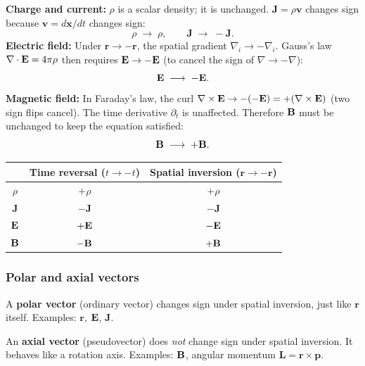\textbf{Charge and current:} $\rho$ is a scalar density; it is unchanged.  $\mathbf{J}=\rho\mathbf{v}$
changes sign because $\mathbf{v}=d\mathbf{x}/dt$ changes sign:
\begin{equation}\label{eq:lec10:P-rho-J}
  \rho \;\longrightarrow\; \rho, \qquad \mathbf{J} \;\longrightarrow\; -\mathbf{J} .
\end{equation}
\textbf{Electric field:} Under $\mathbf{r}\to-\mathbf{r}$, the spatial gradient $\nabla_i\to-\nabla_i$.
Gauss's law $\nabla\cdot\mathbf{E}=4\pi\rho$ then requires $\mathbf{E}\to-\mathbf{E}$ (to cancel the sign of
$\nabla\to-\nabla$):
\begin{equation}\label{eq:lec10:P-E}
  \mathbf{E} \;\longrightarrow\; -\mathbf{E} .
\end{equation}
\textbf{Magnetic field:} In Faraday's law, the curl $\nabla\times\mathbf{E}\to-(-\mathbf{E})=+(\nabla\times\mathbf{E})$
(two sign flips cancel).  The time derivative $\partial_t$ is unaffected.  Therefore $\mathbf{B}$ must be
unchanged to keep the equation satisfied:
\begin{equation}\label{eq:lec10:P-B}
  \mathbf{B} \;\longrightarrow\; +\mathbf{B} .
\end{equation}

\begin{center}
\renewcommand{\arraystretch}{1.3}
\begin{tabular}{ccc}
  \toprule
  & Time reversal ($t\to-t$) & Spatial inversion ($\mathbf{r}\to-\mathbf{r}$) \\
  \midrule
  $\rho$ & $+\rho$ & $+\rho$ \\
  $\mathbf{J}$ & $-\mathbf{J}$ & $-\mathbf{J}$ \\
  $\mathbf{E}$ & $+\mathbf{E}$ & $-\mathbf{E}$ \\
  $\mathbf{B}$ & $-\mathbf{B}$ & $+\mathbf{B}$ \\
  \bottomrule
\end{tabular}
\end{center}

\subsubsection*{Polar and axial vectors}

A \textbf{polar vector} (ordinary vector) changes sign under spatial inversion, just like $\mathbf{r}$
itself.  Examples: $\mathbf{r}$, $\mathbf{E}$, $\mathbf{J}$.

An \textbf{axial vector} (pseudovector) does \emph{not} change sign under spatial inversion.  It
behaves like a rotation axis.  Examples: $\mathbf{B}$, angular momentum $\mathbf{L}=\mathbf{r}\times\mathbf{p}$.

